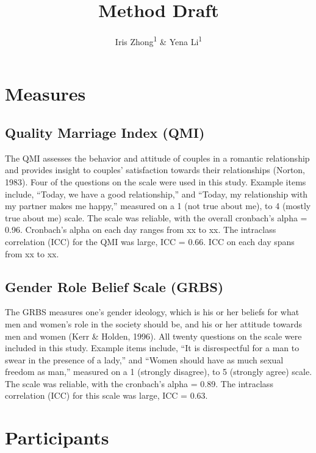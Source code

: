 \documentclass[
  english,
  man]{apa6}
\title{Method Draft}
\author{Iris Zhong\textsuperscript{1} \& Yena Li\textsuperscript{1}}
\date{}
\affiliation{\vspace{0.5cm}\textsuperscript{1} Smith College}
\begin{document}
\maketitle

\hypertarget{measures}{%
\section{Measures}\label{measures}}

\hypertarget{quality-marriage-index-qmi}{%
\subsection{Quality Marriage Index (QMI)}\label{quality-marriage-index-qmi}}

The QMI assesses the behavior and attitude of couples in a romantic relationship and provides insight to couples' satisfaction towards their relationships (Norton, 1983). Four of the questions on the scale were used in this study. Example items include, ``Today, we have a good relationship,'' and ``Today, my relationship with my partner makes me happy,'' measured on a 1 (not true about me), to 4 (mostly true about me) scale. The scale was reliable, with the overall cronbach's alpha = 0.96. Cronbach's alpha on each day ranges from xx to xx. The intraclass correlation (ICC) for the QMI was large, ICC = 0.66. ICC on each day spans from xx to xx.

\hypertarget{gender-role-belief-scale-grbs}{%
\subsection{Gender Role Belief Scale (GRBS)}\label{gender-role-belief-scale-grbs}}

The GRBS measures one's gender ideology, which is his or her beliefs for what men and women's role in the society should be, and his or her attitude towards men and women (Kerr \& Holden, 1996). All twenty questions on the scale were included in this study. Example items include, ``It is disrespectful for a man to swear in the presence of a lady,'' and ``Women should have as much sexual freedom as man,'' measured on a 1 (strongly disagree), to 5 (strongly agree) scale. The scale was reliable, with the cronbach's alpha = 0.89. The intraclass correlation (ICC) for this scale was large, ICC = 0.63.

\hypertarget{participants}{%
\section{Participants}\label{participants}}
\end{document}
